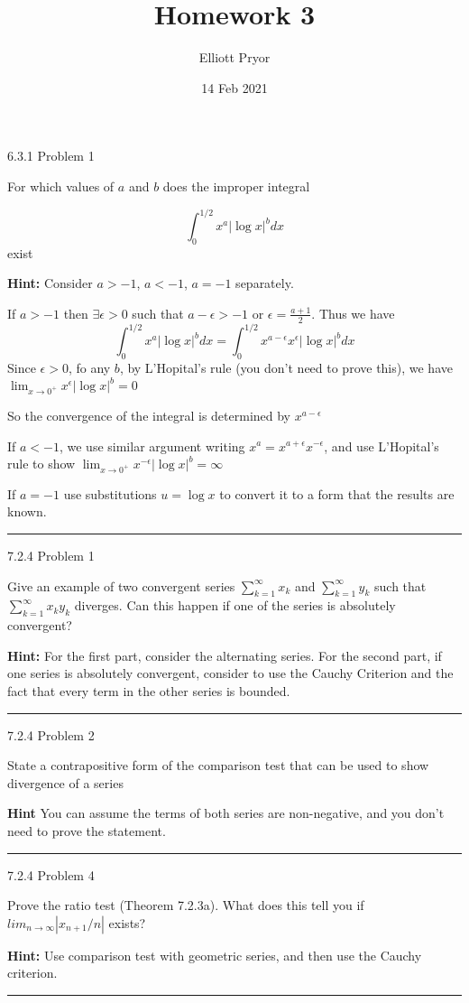 \documentclass[11pt]{article}
\title{Homework 3}
\author{Elliott Pryor}
\date{14 Feb 2021}
\begin{document}
\maketitle

 6.3.1 Problem 1

For which values of $a$ and $b$ does the improper integral

$$\int_0 ^{1/2} x^a | \log x|^b dx$$
exist


\textbf{Hint:} Consider $a > -1$, $a < -1$, $a = -1$ separately.

If $a > -1$ then $\exists \epsilon > 0$ such that $a - \epsilon > -1$ or $\epsilon = \frac{a +1}{2}$. 
Thus we have $$\int_0 ^{1/2} x^a | \log x|^b dx = \int_0 ^{1/2} x^{a - \epsilon} x^\epsilon | \log x|^b dx$$
Since $\epsilon > 0$, fo any $b$, by L'Hopital's rule (you don't need to prove this), we have $\lim_{x \to 0^+} x^\epsilon |\log x|^b = 0$

So the convergence of the integral is determined by $x^{a - \epsilon}$

If $a < -1$, we use similar argument writing $x^a = x^{a + \epsilon} x ^{- \epsilon}$, and use L'Hopital's rule to show
$\lim_{x \to 0^+} x^{-\epsilon}| \log x |^b = \infty$

If $a = -1$ use substitutions $u = \log x$ to convert it to a form that the results are known.

\hrule





 7.2.4 Problem 1

Give an example of two convergent series $\sum_{k = 1} ^\infty x_k$ and $\sum_{k = 1} ^\infty y_k$
such that $\sum_{k = 1} ^\infty x_k y_k$ diverges. Can this happen if one of the series is absolutely convergent?

\textbf{Hint:} For the first part, consider the alternating series. 
For the second part, if one series is absolutely convergent, consider to use the Cauchy Criterion and the fact
that every term in the other series is bounded.

\hrule





 7.2.4 Problem 2

State a contrapositive form of the comparison test that can be used to show divergence of a series

\textbf{Hint} You can assume the terms of both series are non-negative, and you don't need to prove the statement.



\hrule





 7.2.4 Problem 4

Prove the ratio test (Theorem 7.2.3a). What does this tell you if $lim_{n \to \infty} |x_{n+1} / n|$ exists?

\textbf{Hint: } Use comparison test with geometric series, and then use the Cauchy criterion.

\hrule
\end{document}
